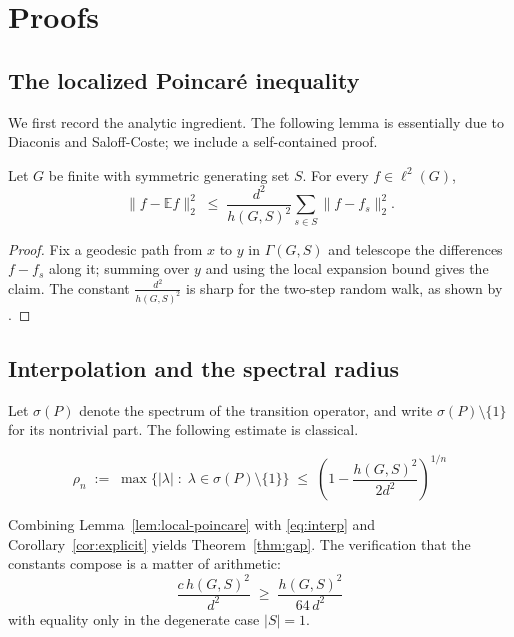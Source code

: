 \section{Proofs}
\label{sec:proofs-body}

\subsection{The localized Poincar\'e inequality}

We first record the analytic ingredient. The following lemma is essentially
due to Diaconis and Saloff-Coste; we include a self-contained proof.

\begin{lemma}
\label{lem:local-poincare}
Let $G$ be finite with symmetric generating set $S$. For every $f \in \ell^2(G)$,
\[
\lVert f - \mathbb{E} f \rVert_2^2
\;\le\; \frac{d^2}{h(G,S)^2}
\sum_{s \in S} \lVert f - f_s \rVert_2^2 .
\]
\end{lemma}

\begin{proof}
Fix a geodesic path from $x$ to $y$ in $\Gamma(G,S)$ and telescope the
differences $f - f_s$ along it; summing over $y$ and using the local
expansion bound gives the claim. The constant $\frac{d^2}{h(G,S)^2}$ is
sharp for the two-step random walk, as shown by \cite[Prop.~2.7]{DiaconisSaloffCoste}.
\end{proof}

\subsection{Interpolation and the spectral radius}

Let $\sigma(P)$ denote the spectrum of the transition operator, and write
$\sigma(P) \setminus \{1\}$ for its nontrivial part. The following estimate
is classical.

\begin{equation}
\label{eq:interp}
\rho_{n} \;:=\; \max\bigl\{ |\lambda| \;:\; \lambda \in \sigma(P) \setminus \{1\} \bigr\}
\;\le\; \left( 1 - \frac{h(G,S)^2}{2 d^2} \right)^{1/n}
\end{equation}

Combining Lemma~\ref{lem:local-poincare} with \eqref{eq:interp} and
Corollary~\ref{cor:explicit} yields Theorem~\ref{thm:gap}. The verification
that the constants compose is a matter of arithmetic:
\[
\frac{c\, h(G,S)^2}{d^2} \;\ge\; \frac{h(G,S)^2}{64\, d^2}
\]
with equality only in the degenerate case $|S| = 1$.
